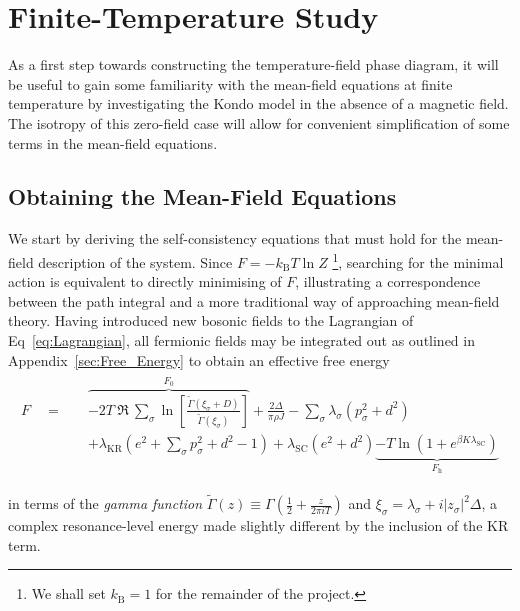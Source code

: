 \documentclass[12pt]{article}
\begin{document}


\section{Finite-Temperature Study}
\label{sec:finite_temperature}

As a first step towards constructing the temperature-field phase diagram, it will be useful to gain some familiarity with the mean-field equations at finite temperature by investigating the Kondo model in the absence of a magnetic field. The isotropy of this zero-field case will allow for convenient simplification of some terms in the mean-field equations.

\subsection{Obtaining the Mean-Field Equations}
\label{subsec:obtaining_MF}

We start by deriving the self-consistency equations that must hold for the mean-field description of the system. Since $ F = - k_{\text{B}} T \ln{Z} $ \footnote{We shall set $ k_{\text{B}} = 1 $ for the remainder of the project.}, searching for the minimal action is equivalent to directly minimising of $ F $, illustrating a correspondence between the path integral and a more traditional way of approaching mean-field theory. Having introduced new bosonic fields to the Lagrangian of Eq~\eqref{eq:Lagrangian}, all fermionic fields may be integrated out as outlined in Appendix~\ref{sec:Free_Energy} to obtain an effective free energy
\begin{align}
\begin{split}
F \quad = \quad & \overbrace{- 2 T~\Re~{\sum_{\sigma}\ln{\left[\frac{\widetilde{\Gamma}(\xi_{\sigma} + D)}{\widetilde{\Gamma}(\xi_{\sigma})} \right]}}}^{F_0} + \frac{2 \Delta}{\pi \rho J} - \sum_{\sigma} \lambda_{\sigma} (p_{\sigma}^2 + d^2)\\
&+ \lambda_{\text{KR}} (e^2 + \sum_{\sigma} p_{\sigma}^2 + d^2 - 1) + \lambda_{\text{SC}} (e^2 + d^2) \underbrace{- T \ln{\left( 1 + e^{\beta K \lambda_{\text{SC}}} \right)}}_{F_{\text{h}}}
\label{eq:Free_Energy}
\end{split}
\end{align}

in terms of the \textit{gamma function} $ \widetilde{\Gamma} (z) \equiv \Gamma (\frac{1}{2} + \frac{z}{2 \pi i T}) $ and $ \xi_{\sigma} = \lambda_{\sigma} + i |z_{\sigma}|^2 \Delta $, a complex resonance-level energy made slightly different by the inclusion of the KR term.
\end{document}
